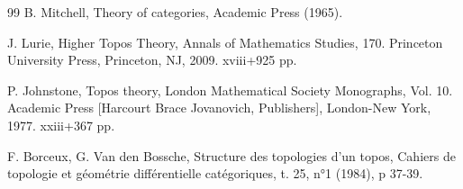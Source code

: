 \documentclass[10pt]{../fichiers-configuration-latex/smfart}
\begin{document}
\begin{thebibliography}{99}
 B. Mitchell, Theory of categories, Academic Press
(1965).

 J. Lurie, Higher Topos Theory, Annals of Mathematics Studies, 170. Princeton University Press, 
Princeton, NJ, 2009. xviii+925 pp.

  P. Johnstone, Topos theory, 
London Mathematical Society Monographs, Vol. 10. 
Academic Press [Harcourt Brace Jovanovich, Publishers], London-New York, 1977. xxiii+367 pp.

 F. Borceux, G. Van den Bossche, Structure des topologies
d'un topos, Cahiers de topologie et géométrie différentielle catégoriques,
t. 25, n°1 (1984), p 37-39.

\end{thebibliography}

\ifx\danslelivre\undefined
\end{document}
